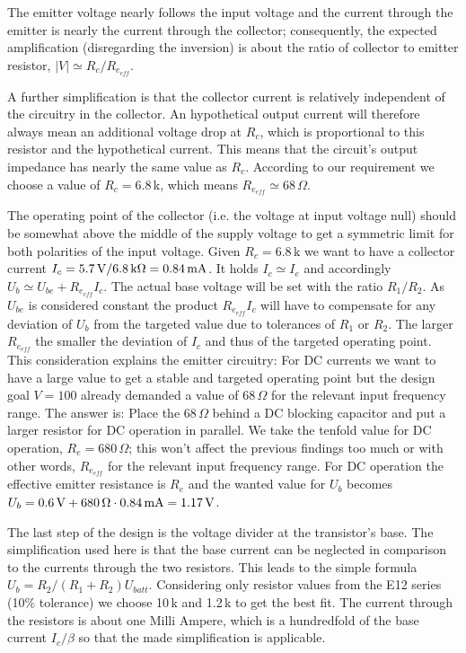 The emitter voltage nearly follows the input voltage and the current
through the emitter is nearly the current through the collector;
consequently, the expected amplification (disregarding the inversion) is
about the ratio of collector to emitter resistor,
$\left| V \right| \simeq R_c/R_{e_{eff}}$.

A further simplification is that the collector current is relatively
independent of the circuitry in the collector. An hypothetical output
current will therefore always mean an additional voltage drop at $R_c$,
which is proportional to this resistor and the hypothetical current. This
means that the circuit's output impedance has nearly the same value as
$R_c$. According to our requirement we choose a value of $R_c=6.8$\,k, which
means $R_{e_{eff}} \simeq 68\,\Omega$.

The operating point of the collector (i.e. the voltage at input voltage
null) should be somewhat above the middle of the supply voltage to get a
symmetric limit for both polarities of the input voltage. Given $R_c=6.8$\,k
we want to have a collector current
$I_c=5.7\text{\,V}/6.8\text{\,k}\Omega=0.84\text{\,mA}$. It holds
$I_c \simeq I_e$ and accordingly $U_b \simeq U_{be} + R_{e_{eff}} I_c$.
The actual base voltage will be set with the ratio $R_1/R_2$. As $U_{be}$
is considered constant the product $R_{e_{eff}} I_c$ will have to
compensate for any deviation of $U_b$ from the targeted value due to
tolerances of $R_1$ or $R_2$. The larger $R_{e_{eff}}$ the smaller the
deviation of $I_c$ and thus of the targeted operating point.
This consideration explains the emitter circuitry: For DC currents we want
to have a large value to get a stable and targeted operating point but the
design goal $V=100$ already demanded a value of 68\,$\Omega$ for the
relevant input frequency range. The answer is: Place the 68\,$\Omega$ behind
a DC blocking capacitor and put a larger resistor for DC operation in
parallel. We take the tenfold value for DC operation, $R_e=680\,\Omega$;
this won't affect the previous findings too much or with other words,
$R_{e_{eff}}$ for the relevant input frequency range. For DC operation the
effective emitter resistance is $R_e$ and the wanted value for $U_b$ becomes 
$U_b=0.6\text{\,V}+680\text{\,}\Omega \cdot 0.84\text{\,mA}=1.17\text{\,V}$.

The last step of the design is the voltage divider at the transistor's
base. The simplification used here is that the base current can be
neglected in comparison to the currents through the two resistors. This
leads to the simple formula $U_b = R_2/(R_1+R_2) U_{batt}$. Considering
only resistor values from the E12 series (10\% tolerance) we choose 10\,k
and 1.2\,k to get the best fit. The current through the resistors is about
one Milli Ampere, which is a hundredfold of the base current $I_c/\beta$ so
that the made simplification is applicable.


